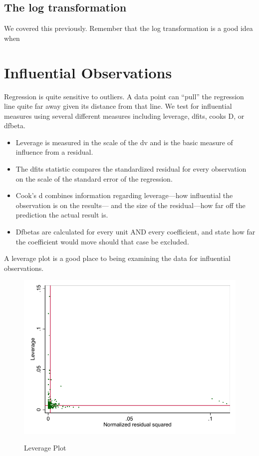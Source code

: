\documentclass[12pt]{article}
\begin{document}
\subsection{The log transformation}
\label{sec:log-transformation}

We covered this previously. Remember that the log transformation is a
good idea when 

\section{Influential Observations}
\label{sec:infl-observ}

Regression is quite sensitive to outliers. A data point can ``pull''
the regression line quite far away given its distance from that
line. We test for influential measures using several different
measures including 
leverage, dfits, cooks D, or dfbeta.

\begin{itemize}
\item Leverage is measured in the scale of the dv and is the basic
  measure of influence from a residual.

\item The dfits statistic compares the standardized residual for every
  observation on the scale of the standard error of the regression. 

\item Cook's d combines information regarding leverage---how
  influential the observation is on the results--- and the size of the
  residual---how far off the prediction the actual result is. 

\item Dfbetas are calculated for every unit AND every coefficient, and
  state how far the coefficient would move should that case be
  excluded. 

\end{itemize}

A leverage plot is a good place to being examining the data for
influential observations.

\begin{figure}[ht!]
  \centering
  \caption{Leverage Plot}  
\includegraphics{levplot}
  \label{fig:levplot}
\end{figure}
\end{document}
